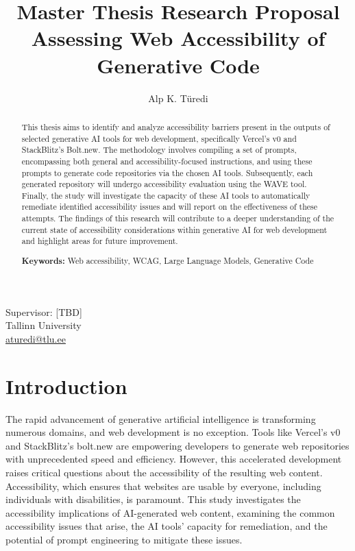 \documentclass{article}
\title{%
  \textbf{Master Thesis Research Proposal}\\
  \vfill
  \textbf{Assessing Web Accessibility of Generative Code}
}
\author{Alp K. Türedi}
\begin{document}
\maketitle

{\centering
  Supervisor: [TBD]\\
  \vfill
  Tallinn University\\
  \href{mailto:aturedi@tlu.ee}{aturedi@tlu.ee}\\
}

\begin{abstract}
  This thesis aims to identify and analyze accessibility barriers present in the outputs of selected generative AI tools for web development,
  specifically Vercel's v0 and StackBlitz's Bolt.new.
  The methodology involves compiling a set of prompts, encompassing both general and accessibility-focused instructions,
  and using these prompts to generate code repositories via the chosen AI tools.
  Subsequently, each generated repository will undergo accessibility evaluation using the WAVE tool.
  Finally, the study will investigate the capacity of these AI tools to automatically remediate identified accessibility issues
  and will report on the effectiveness of these attempts.
  The findings of this research will contribute to a deeper understanding of the current state of accessibility considerations within generative AI
  for web development and highlight areas for future improvement.

  \vfill
  \textbf{Keywords:} Web accessibility, WCAG, Large Language Models, Generative Code
\end{abstract}


\section{Introduction}
The rapid advancement of generative artificial intelligence is transforming numerous domains, and web development is no exception.
Tools like Vercel's v0 and StackBlitz's bolt.new are empowering developers to generate web repositories with unprecedented speed and efficiency.
However, this accelerated development raises critical questions about the accessibility of the resulting web content.
Accessibility, which ensures that websites are usable by everyone, including individuals with disabilities, is paramount.
This study investigates the accessibility implications of AI-generated web content, examining the common accessibility issues that arise,
the AI tools' capacity for remediation, and the potential of prompt engineering to mitigate these issues.
\end{document}
